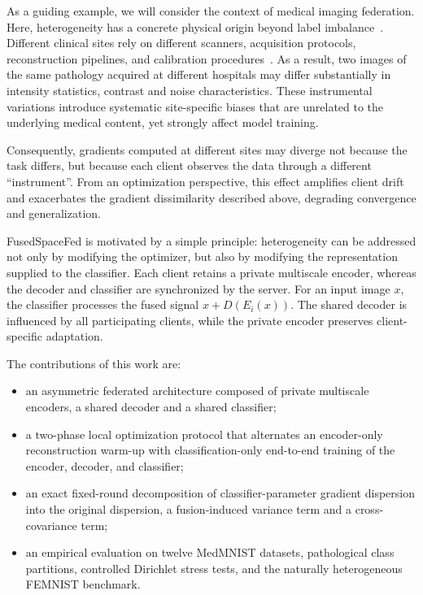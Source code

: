 \documentclass[twoside]{article}
\theoremstyle{thmstyleone}%
\theoremstyle{thmstyletwo}%
\theoremstyle{thmstylethree}%
\begin{document}
As a guiding example, we will consider the context of medical imaging federation. Here, heterogeneity has a concrete physical origin beyond label imbalance~\cite{sheller2018multi,guan2024federated}. Different clinical sites rely on different scanners, acquisition protocols, reconstruction pipelines, and calibration procedures~\cite{glocker2019machine,dinsdale2021unlearning}. As a result, two images of the same pathology acquired at different hospitals may differ substantially in intensity statistics, contrast and noise characteristics. These instrumental variations introduce systematic site-specific biases that are unrelated to the underlying medical content, yet strongly affect model training.

Consequently, gradients computed at different sites may diverge not because the task differs, but because each client observes the data through a different ``instrument''. From an optimization perspective, this effect amplifies client drift and exacerbates the gradient dissimilarity described above, degrading convergence and generalization.

FusedSpaceFed is motivated by a simple principle: heterogeneity can be addressed not only by modifying the optimizer, but also by modifying the representation supplied to the classifier. Each client retains a private multiscale encoder, whereas the decoder and classifier are synchronized by the server. For an input image $x$, the classifier processes the fused signal $x+D(E_i(x))$. The shared decoder is influenced by all participating clients, while the private encoder preserves client-specific adaptation.

The contributions of this work are:
\begin{itemize}
    \item an asymmetric federated architecture composed of private multiscale encoders, a shared decoder and a shared classifier;
    \item a two-phase local optimization protocol that alternates an encoder-only reconstruction warm-up with classification-only end-to-end training of the encoder, decoder, and classifier;
    \item an exact fixed-round decomposition of classifier-parameter gradient dispersion into the original dispersion, a fusion-induced variance term and a cross-covariance term;
    \item an empirical evaluation on twelve MedMNIST datasets, pathological class partitions, controlled Dirichlet stress tests, and the naturally heterogeneous FEMNIST benchmark.
\end{itemize}
\end{document}
